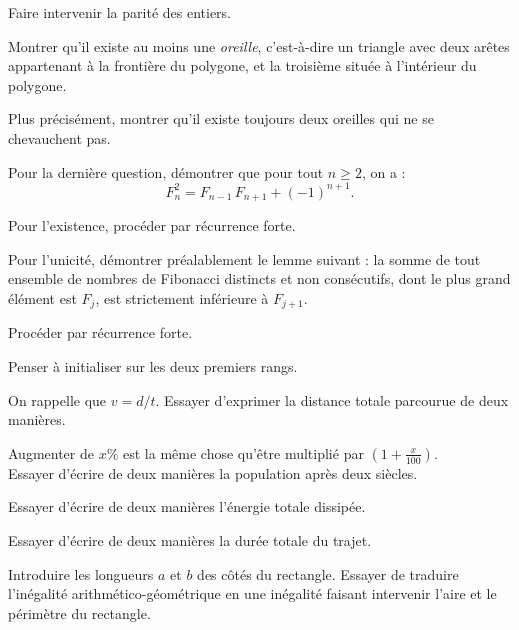 \begin{Hint}{44}
Faire intervenir la parité des entiers.
\end{Hint}
\begin{Hint}{47}
Montrer qu'il existe au moins une \emph{oreille}, c'est-à-dire un triangle avec deux arêtes appartenant à la frontière du polygone, et la troisième située à l'intérieur du polygone.

Plus précisément, montrer qu'il existe toujours deux oreilles  qui ne se chevauchent pas.
\end{Hint}
\begin{Hint}{48}
Pour la dernière question, démontrer que pour tout $n\geq 2$, on a :\[F_n^2 = F_{n-1}\,F_{n+1} + (-1)^{n+1}.\]
\end{Hint}
\begin{Hint}{50}
Pour l'existence, procéder par récurrence forte.

Pour l'unicité, démontrer préalablement le lemme suivant : la somme de tout ensemble de nombres de Fibonacci distincts et non consécutifs, dont le plus grand élément est $F_j$, est strictement inférieure à $F_{j + 1}$.
\end{Hint}
\begin{Hint}{51}
Procéder par récurrence forte.
\end{Hint}
\begin{Hint}{52}
Penser à initialiser sur les deux premiers rangs.
\end{Hint}
\begin{Hint}{53}
On rappelle que $v=d/t$. Essayer d'exprimer la distance totale parcourue de deux manières.
\end{Hint}
\begin{Hint}{54}
Augmenter de $x\%$ est la même chose qu'être multiplié par $\displaystyle \left( 1+\frac{x}{100} \right)$. \\
Essayer d'écrire de deux manières la population après deux siècles.
\end{Hint}
\begin{Hint}{55}
Essayer d'écrire de deux manières l'énergie totale dissipée.
\end{Hint}
\begin{Hint}{56}
Essayer d'écrire de deux manières la durée totale du trajet.
\end{Hint}
\begin{Hint}{57}
Introduire les longueurs $a$ et $b$ des côtés du rectangle. Essayer de traduire l'inégalité arithmético-géométrique en une inégalité faisant intervenir l'aire et le périmètre du rectangle.
\end{Hint}
